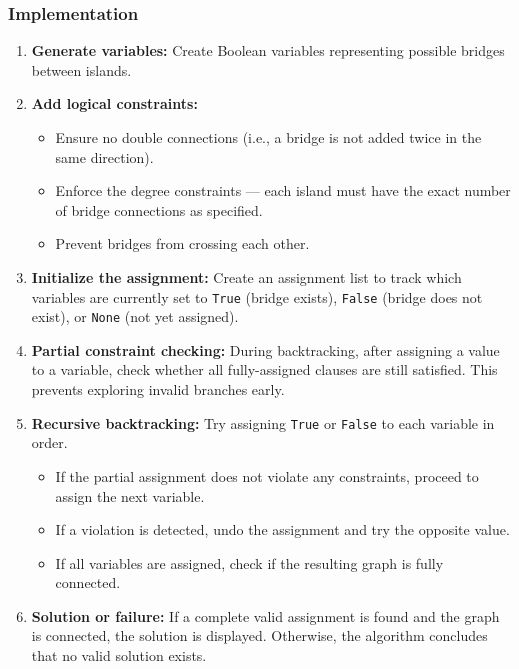 \subsubsection{Implementation}
\begin{enumerate}
  \item \textbf{Generate variables:} Create Boolean variables representing possible bridges between islands.

  \item \textbf{Add logical constraints:}
  \begin{itemize}
    \item Ensure no double connections (i.e., a bridge is not added twice in the same direction).
    \item Enforce the degree constraints — each island must have the exact number of bridge connections as specified.
    \item Prevent bridges from crossing each other.
  \end{itemize}

  \item \textbf{Initialize the assignment:} 
  Create an assignment list to track which variables are currently set to \texttt{True} (bridge exists), \texttt{False} (bridge does not exist), or \texttt{None} (not yet assigned).

  \item \textbf{Partial constraint checking:} 
  During backtracking, after assigning a value to a variable, check whether all fully-assigned clauses are still satisfied. This prevents exploring invalid branches early.

  \item \textbf{Recursive backtracking:}
  Try assigning \texttt{True} or \texttt{False} to each variable in order.
  \begin{itemize}
    \item If the partial assignment does not violate any constraints, proceed to assign the next variable.
    \item If a violation is detected, undo the assignment and try the opposite value.
    \item If all variables are assigned, check if the resulting graph is fully connected.
  \end{itemize}

  \item \textbf{Solution or failure:}
  If a complete valid assignment is found and the graph is connected, the solution is displayed.
  Otherwise, the algorithm concludes that no valid solution exists.
\end{enumerate}